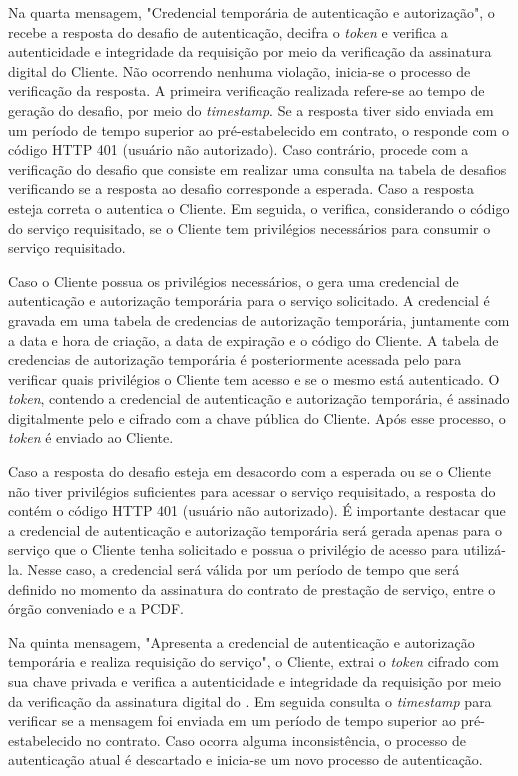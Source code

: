 Na quarta mensagem, "Credencial temporária de autenticação e autorização", o \servidorAA{} recebe a resposta do desafio de autenticação, decifra o \emph{token} e verifica a autenticidade e integridade da requisição por meio da verificação da assinatura digital do Cliente. Não ocorrendo nenhuma violação, inicia-se o processo de verificação da resposta. A primeira verificação realizada refere-se ao tempo de geração do desafio, por meio do \emph{timestamp}. Se a resposta tiver sido enviada em um período de tempo superior ao pré-estabelecido em contrato, o \servidorAA{} responde com o código HTTP 401 (usuário não autorizado). Caso contrário, procede com a verificação do desafio que consiste em realizar uma consulta na tabela de desafios verificando se a resposta ao desafio corresponde a esperada. Caso a resposta esteja correta o \servidorAA{}
autentica o Cliente. Em seguida, o \servidorAA{} verifica, considerando o código do serviço requisitado, se o Cliente tem privilégios necessários para consumir o serviço requisitado.

Caso o Cliente possua os privilégios necessários, o \servidorAA{} gera uma credencial de autenticação e autorização temporária para o serviço solicitado. A credencial é gravada em uma tabela de credencias de autorização temporária, juntamente com a data e hora de criação, a data de expiração e o código do Cliente. A tabela de credencias de autorização temporária é posteriormente acessada pelo \servidorRest{} para verificar quais privilégios o Cliente tem acesso e se o mesmo está autenticado. O \emph{token}, contendo a credencial de autenticação e autorização temporária, é  assinado digitalmente pelo \servidorAA{} e cifrado  com a chave pública do Cliente. Após esse processo, o \emph{token} é enviado ao Cliente.

Caso a resposta do desafio esteja em desacordo com a esperada ou se o Cliente não tiver privilégios suficientes para acessar o serviço requisitado, a resposta do \servidorAA{} contém o código HTTP 401 (usuário não autorizado).
É importante destacar que a credencial de autenticação e autorização temporária será gerada apenas para o serviço que o Cliente tenha solicitado e possua o privilégio de acesso para utilizá-la. Nesse caso, a credencial será válida por um período  de tempo que será definido no momento da assinatura do contrato de prestação de serviço,
entre o órgão conveniado e a PCDF.

Na quinta mensagem, "Apresenta a credencial de autenticação e autorização temporária e realiza requisição do serviço", o Cliente, extrai o \emph{token} cifrado com sua chave privada e verifica a autenticidade e integridade da requisição por meio da verificação da assinatura digital do \servidorAA. Em seguida consulta o \emph{timestamp} para verificar se a mensagem foi enviada em um período de tempo superior ao pré-estabelecido no contrato. Caso ocorra alguma inconsistência, o processo de autenticação atual é descartado e inicia-se um novo processo de autenticação.

